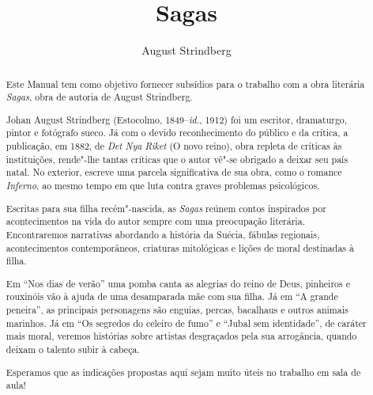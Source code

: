 \documentclass[12pt]{extarticle}
\begin{document}
\baselineskip\par


\newcommand{\AutorLivro}{August Strindberg}
\newcommand{\TituloLivro}{Sagas}
\newcommand{\Tema}{Ficção, mistério e fantasia}
\newcommand{\Genero}{Conto, crônica e novela}
\newcommand{\imagemCapa}{./images/PNLD0040-01.png}
\newcommand{\issnppub}{---}
\newcommand{\issnepub}{---}
\newcommand{\colaborador}{\textbf{Bruno Gradella e Vicente Castro}}


\title{\TituloLivro}
\author{\AutorLivro}
\def\authornotes{\colaborador}

\date{}
\maketitle

\begin{abstract}
Este Manual tem como objetivo fornecer subsídios para o trabalho com a
obra literária \emph{Sagas}, obra de autoria de August Strindberg.

Johan August Strindberg (Estocolmo, 1849--\textit{id.}, 1912) 
foi um escritor, dramaturgo, pintor e fotógrafo sueco. Já com o devido
reconhecimento do público e da crítica, a publicação, em 1882, de 
\textit{Det Nya Riket} (O novo reino), obra repleta de críticas às 
instituições, rende"-lhe tantas críticas que o autor vê"-se obrigado
a deixar seu país natal. No exterior, escreve uma parcela significativa 
de sua obra, como o romance \textit{Inferno}, ao mesmo tempo em que 
luta contra graves problemas psicológicos.

Escritas para sua filha recém"-nascida, as \textit{Sagas} reúnem contos
inspirados por acontecimentos na vida do autor sempre com uma preocupação 
literária. Encontraremos narrativas abordando a história da Suécia, fábulas 
regionais, acontecimentos contemporâneos, criaturas mitológicas e lições de 
moral destinadas à filha. 

Em ``Nos dias de verão'' uma pomba canta as alegrias do reino de Deus, 
pinheiros e rouxinóis vão à ajuda de uma desamparada mãe com sua filha. 
Já em ``A grande peneira'', as principais personagens são enguias, percas, 
bacalhaus e outros animais marinhos. Já em ``Os segredos do celeiro de fumo''
e ``Jubal sem identidade'', de caráter mais moral, veremos histórias sobre 
artistas desgraçados pela sua arrogância, quando deixam o talento subir à cabeça.

Esperamos que as indicações propostas aqui sejam muito úteis no trabalho em
sala de aula! 


\end{abstract}
\end{document}
